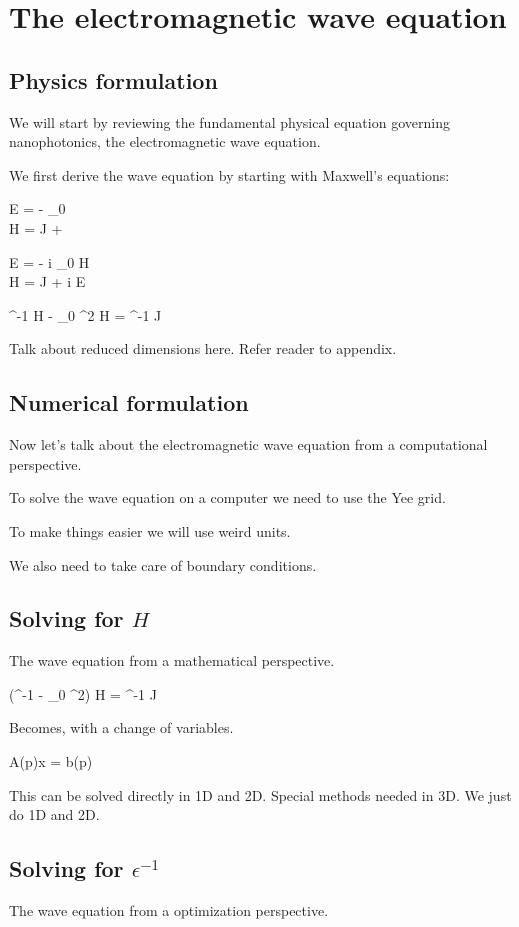 \section{The electromagnetic wave equation}

\subsection{Physics formulation}
We will start by reviewing 
    the fundamental physical equation governing nanophotonics, 
    the electromagnetic wave equation.

We first derive the wave equation by starting with Maxwell's equations:


\BA \curl E = - \mu_0  \\
    \curl H = J + \epsilon {} \EA

\BA \curl E = - i \mu_0 \omega H \\
    \curl H = J + i \epsilon \omega E \EA

\BE \curl \epsilon^{-1} \curl H - \mu_0 \omega^2 H = \curl \epsilon^{-1} J \EE

Talk about reduced dimensions here. Refer reader to appendix.

\subsection{Numerical formulation}
Now let's talk about the electromagnetic wave equation from a computational perspective.

To solve the wave equation on a computer we need to use the Yee grid.

To make things easier we will use weird units.

We also need to take care of boundary conditions.

\subsection{Solving for $H$}
The wave equation from a mathematical perspective.

\BE (\curl \epsilon^{-1} \curl - \mu_0 \omega^2) H = \curl \epsilon^{-1} J \EE

Becomes, with a change of variables.

\BE A(p)x = b(p) \EE 

This can be solved directly in 1D and 2D. 
Special methods needed in 3D. 
We just do 1D and 2D.

\subsection{Solving for $\epsilon^{-1}$}
The wave equation from a optimization perspective.

